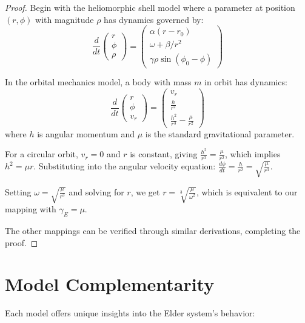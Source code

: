 \begin{proof}
Begin with the heliomorphic shell model where a parameter at position $(r,\phi)$ with magnitude $\rho$ has dynamics governed by:
\begin{equation}
    \frac{d}{dt}\begin{pmatrix} r \\ \phi \\ \rho \end{pmatrix} = \begin{pmatrix} 
    \alpha(r-r_0) \\ 
    \omega + \beta/r^2 \\ 
    \gamma\rho\sin(\phi_0 - \phi) 
    \end{pmatrix}
\end{equation}

In the orbital mechanics model, a body with mass $m$ in orbit has dynamics:
\begin{equation}
    \frac{d}{dt}\begin{pmatrix} r \\ \phi \\ v_r \end{pmatrix} = \begin{pmatrix} 
    v_r \\ 
    \frac{h}{r^2} \\ 
    \frac{h^2}{r^3} - \frac{\mu}{r^2} 
    \end{pmatrix}
\end{equation}
where $h$ is angular momentum and $\mu$ is the standard gravitational parameter.

For a circular orbit, $v_r = 0$ and $r$ is constant, giving $\frac{h^2}{r^3} = \frac{\mu}{r^2}$, which implies $h^2 = \mu r$. Substituting into the angular velocity equation: $\frac{d\phi}{dt} = \frac{h}{r^2} = \sqrt{\frac{\mu}{r^3}}$.

Setting $\omega = \sqrt{\frac{\mu}{r^3}}$ and solving for $r$, we get $r = \sqrt[3]{\frac{\mu}{\omega^2}}$, which is equivalent to our mapping with $\gamma_E = \mu$.

The other mappings can be verified through similar derivations, completing the proof.
\end{proof}

\section{Model Complementarity}

Each model offers unique insights into the Elder system's behavior:

